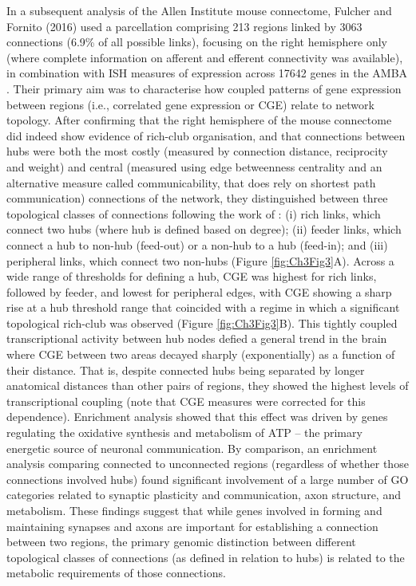 In a subsequent analysis of the Allen Institute mouse connectome, Fulcher and Fornito (2016) used a parcellation comprising 213 regions linked by 3063 connections (6.9\% of all possible links), focusing on the right hemisphere only (where complete information on afferent and efferent connectivity was available), in combination with ISH measures of expression across \num{17642} genes in the AMBA \citep{Lein2007a}.
Their primary aim was to characterise how coupled patterns of gene expression between regions (i.e., correlated gene expression or CGE) relate to network topology. After confirming that the right hemisphere of the mouse connectome did indeed show evidence of rich-club organisation, and that connections between hubs were both the most costly (measured by connection distance, reciprocity and weight) and central (measured using edge betweenness centrality and an alternative measure called communicability, that does rely on shortest path communication) connections of the network, they distinguished between three topological classes of connections following the work of \citet{VandenHeuvel2012}: (i) rich links, which connect two hubs (where hub is defined based on degree); (ii) feeder links, which connect a hub to non-hub (feed-out) or a non-hub to a hub (feed-in);
and (iii) peripheral links, which connect two non-hubs (Figure \ref{fig:Ch3Fig3}A).
Across a wide range of thresholds for defining a hub, CGE was highest for rich links, followed by feeder, and lowest for peripheral edges, with CGE showing a sharp rise at a hub threshold range that coincided with a regime in which a significant topological rich-club was observed (Figure \ref{fig:Ch3Fig3}B). This tightly coupled transcriptional activity between hub nodes defied a general trend in the brain where CGE between two areas decayed sharply (exponentially) as a function of their distance. That is, despite connected hubs being separated by longer anatomical distances than other pairs of regions, they showed the highest levels of transcriptional coupling (note that CGE measures were corrected for this dependence).
Enrichment analysis showed that this effect was driven by genes regulating the oxidative synthesis and metabolism of ATP -- the primary energetic source of neuronal communication. By comparison, an enrichment analysis comparing connected to unconnected regions (regardless of whether those connections involved hubs) found significant involvement of a large number of GO categories related to synaptic plasticity and communication, axon structure, and metabolism. These findings suggest that while genes involved in forming and maintaining synapses and axons are important for establishing a connection between two regions, the primary genomic distinction between different topological classes of connections (as defined in relation to hubs) is related to the metabolic requirements of those connections.

